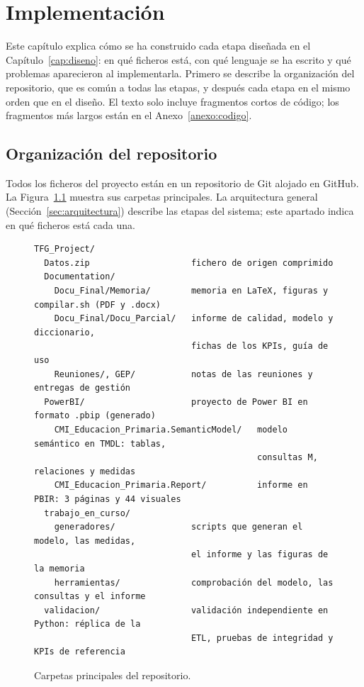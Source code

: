 \documentclass[12pt, a4paper, oneside]{report}
\begin{document}
\chapter{Implementación}
\label{cap:implementacion}
Este capítulo explica cómo se ha construido cada etapa diseñada en el Capítulo~\ref{cap:diseno}: en qué ficheros está, con qué lenguaje se ha escrito y qué problemas aparecieron al implementarla. Primero se describe la organización del repositorio, que es común a todas las etapas, y después cada etapa en el mismo orden que en el diseño. El texto solo incluye fragmentos cortos de código; los fragmentos más largos están en el Anexo~\ref{anexo:codigo}.

\section{Organización del repositorio}
\label{sec:organizacion_proyecto}
Todos los ficheros del proyecto están en un repositorio de Git alojado en GitHub. La Figura~\ref{fig:repositorio} muestra sus carpetas principales. La arquitectura general (Sección~\ref{sec:arquitectura}) describe las etapas del sistema; este apartado indica en qué ficheros está cada una.

\begin{figure}[!htbp]
\par\vspace{1ex}\noindent\begin{minipage}{\textwidth}\footnotesize{}
\begin{verbatim}
TFG_Project/
  Datos.zip                    fichero de origen comprimido
  Documentation/
    Docu_Final/Memoria/        memoria en LaTeX, figuras y compilar.sh (PDF y .docx)
    Docu_Final/Docu_Parcial/   informe de calidad, modelo y diccionario,
                               fichas de los KPIs, guía de uso
    Reuniones/, GEP/           notas de las reuniones y entregas de gestión
  PowerBI/                     proyecto de Power BI en formato .pbip (generado)
    CMI_Educacion_Primaria.SemanticModel/   modelo semántico en TMDL: tablas,
                                            consultas M, relaciones y medidas
    CMI_Educacion_Primaria.Report/          informe en PBIR: 3 páginas y 44 visuales
  trabajo_en_curso/
    generadores/               scripts que generan el modelo, las medidas,
                               el informe y las figuras de la memoria
    herramientas/              comprobación del modelo, las consultas y el informe
  validacion/                  validación independiente en Python: réplica de la
                               ETL, pruebas de integridad y KPIs de referencia
\end{verbatim}
\end{minipage}\par\vspace{1ex}
\caption{Carpetas principales del repositorio.}
\label{fig:repositorio}
\end{figure}
\end{document}

